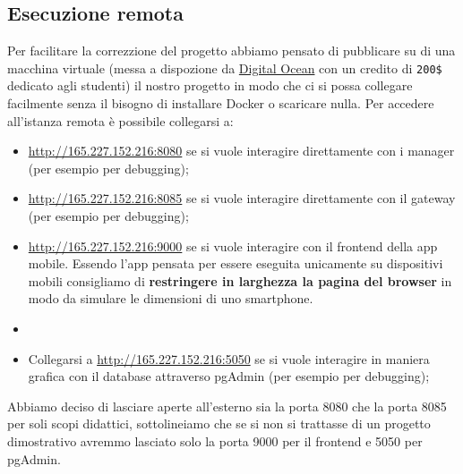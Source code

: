 \subsection{Esecuzione remota}
Per facilitare la correzzione del progetto abbiamo pensato di pubblicare su di una macchina virtuale (messa a dispozione da \href{https://www.digitalocean.com}{Digital Ocean} con un credito di \verb|200$| dedicato agli studenti) il nostro progetto in modo che ci si possa collegare facilmente senza il bisogno di installare Docker o scaricare nulla. Per accedere all'istanza remota è possibile collegarsi a:
\begin{itemize}
  \item \href{http://165.227.152.216:8080}{http://165.227.152.216:8080} se si vuole interagire direttamente con i manager (per esempio per debugging);
  \item \href{http://165.227.152.216:8085}{http://165.227.152.216:8085} se si vuole interagire direttamente con il gateway (per esempio per debugging);
  \item \href{http://165.227.152.216:9000}{http://165.227.152.216:9000} se si vuole interagire con il frontend della app mobile. Essendo l'app pensata per essere eseguita unicamente su dispositivi mobili consigliamo di \textbf{restringere in larghezza la pagina del browser} in modo da simulare le dimensioni di uno smartphone.
  \item     
  \item Collegarsi a \href{http://165.227.152.216:5050}{http://165.227.152.216:5050} se si vuole interagire in maniera grafica con il database attraverso pgAdmin (per esempio per debugging);
\end{itemize}
Abbiamo deciso di lasciare aperte all'esterno sia la porta 8080 che la porta 8085 per soli scopi didattici, sottolineiamo che se si non si trattasse di un progetto dimostrativo avremmo lasciato solo la porta 9000 per il frontend e 5050 per pgAdmin.



